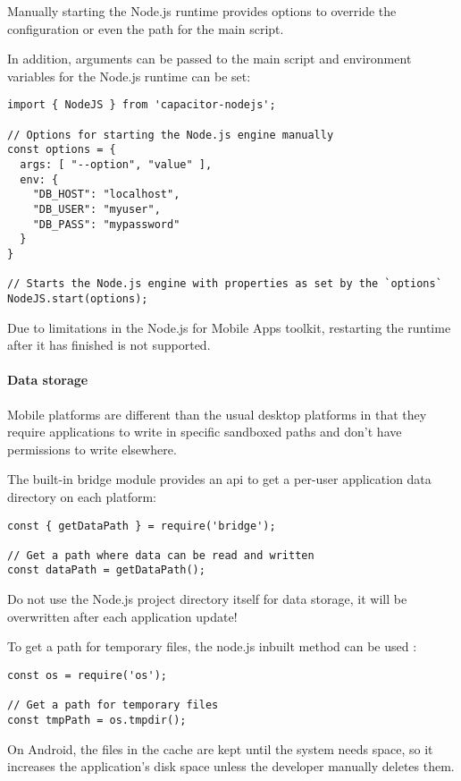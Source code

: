 Manually starting the Node.js runtime provides options to override the  configuration or even the path for the main script.

In addition, arguments can be passed to the main script and environment variables for the Node.js runtime can be set:

\begin{verbatim}
import { NodeJS } from 'capacitor-nodejs';

// Options for starting the Node.js engine manually
const options = {
  args: [ "--option", "value" ],
  env: {
    "DB_HOST": "localhost",
    "DB_USER": "myuser",
    "DB_PASS": "mypassword"
  }
}

// Starts the Node.js engine with properties as set by the `options`
NodeJS.start(options);
\end{verbatim}

\begin{note}[Note]
  Due to limitations in the Node.js for Mobile Apps toolkit, restarting the runtime after it has finished is not supported.
  \cite{nodejs-mobile:docs}
\end{note}

\newpage

\paragraph{Data storage}
\label{sec:Capacitor-NodeJS:DataStorage}

Mobile platforms are different than the usual desktop platforms in that they require applications to write in specific sandboxed paths and don't have permissions to write elsewhere.
\cite{nodejs-mobile:docs}

The built-in bridge module provides an \ac{api} to get a per-user application data directory on each platform:

\begin{verbatim}
const { getDataPath } = require('bridge');

// Get a path where data can be read and written
const dataPath = getDataPath();
\end{verbatim}

\begin{warning}[Warning]
  Do not use the Node.js project directory itself for data storage, it will be overwritten after each application update!
  \cite{nodejs-mobile:docs}
\end{warning}

To get a path for temporary files, the node.js inbuilt method  can be used \cite{nodejs}:

\begin{verbatim}
const os = require('os');

// Get a path for temporary files
const tmpPath = os.tmpdir();
\end{verbatim}

\begin{warning}[Warning]
  On Android, the files in the cache are kept until the system needs space, so it increases the application's disk space unless the developer manually deletes them.
  \cite{nodejs-mobile:docs}
\end{warning}
